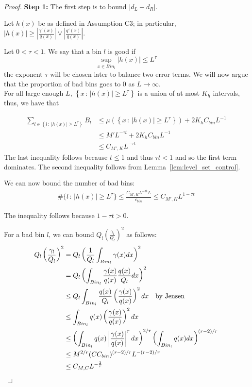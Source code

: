 \begin{proof}

\textbf{Step 1:} 
The first step is to bound $|d_L - d_R|$. 

Let $h(x)$ be as defined in Assumption C3; in particular, $|h(x)| \geq 
\left| \frac{\gamma'(x)}{q(x)} \right| \vee \left| \frac{q'(x)}{q(x)} \right|$. 

Let $0 < \tau < 1$. We say that a bin $l$ is good if
$$
\sup_{x \in Bin_l} |h(x)| \leq L^\tau
$$
the exponent $\tau$ will be chosen later to balance two error terms. We will now argue that the proportion of bad bins goes to 0 as $L \rightarrow \infty$.\\



For all large enough $L$, $\left \{x \,:\, 
    |h(x)|  \geq L^\tau \right \}$ is a union of at most $K_h$ intervals, thus, we have that

\begin{align*}
\sum_{l \in \left \{ l \,:\, |h(x)| 
           \geq L^\tau \right \}}  B_l &\leq 
   \mu \left( \left\{x \,:\, |h(x)|
         \geq L^\tau \right\} \right) + 2 K_h C_{bin} L^{-1} \\
  &\leq M' L^{-\tau t}  + 2K_h C_{bin} L^{-1} \\
  & \leq C_{M', K} L^{ - \tau t} 
\end{align*}
The last inequality follows because $t \leq 1$ and thus $\tau t < 1$ and so the first term dominates. The second inequality follows from {Lemma}~\ref{lem:level_set_control}.

We can now bound the number of bad bins: 
\begin{align*}
\# \{ l \,:\, |h(x)| \geq L^\tau \} \leq \frac{C_{M', K} L^{- \tau t} L}{c_{bin}}  \leq C_{M',K} L^{1 - \tau t}
\end{align*}

The inequality follows because $1 - \tau t > 0$. 

For a bad bin $l$, we can bound $Q_l \left( \frac{\gamma_l}{Q_l} \right)^2$ as follows:
\begin{align*}
Q_l \left( \frac{\gamma_l}{Q_l} \right)^2 &= Q_l \left( \frac{1}{Q_l} \int_{Bin_l} \gamma(x) dx \right)^2 \\
   &= Q_l \left(  \int_{Bin_l} \frac{\gamma(x)}{q(x)} \frac{q(x)}{Q_l} dx \right)^2 \\
   &\leq Q_l \int_{Bin_l} \frac{q(x)}{Q_l} \left( \frac{\gamma(x)}{q(x)} \right)^2 dx \quad \textrm{by Jensen} \\
   &\leq \int_{Bin_l} q(x) \left( \frac{\gamma(x)}{q(x)} \right)^2 dx \\
   &\leq \left(\int_{Bin_l} q(x) \left| \frac{\gamma(x)}{q(x)} \right|^r dx \right)^{2/r}
         \left(\int_{Bin_l} q(x) dx \right)^{(r-2)/r} \\
   &\leq M^{2/r} (C C_{bin})^{(r-2)/r} L^{-(r-2)/r} \\
   &\leq C_{M, C} L^{- \frac{2}{r}}
\end{align*}


\end{proof}
